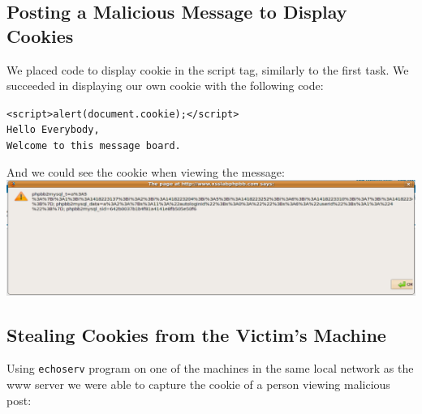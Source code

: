 \documentclass[12pt, a4paper, pdflatex]{article}
\begin{document}
\subsection{Posting a Malicious Message to Display Cookies}
We placed code to display cookie in the script tag, similarly to the first task. We succeeded in displaying our own cookie with the following code:\\
\begin{center}\texttt{<script>alert(document.cookie);</script>\\Hello Everybody,\\Welcome to this message board.}\end{center}

And we could see the cookie when viewing the message:\\
\includegraphics[width=.95\textwidth]{gfx/xss/task2.png}

\subsection{Stealing Cookies from the Victim's Machine}
Using \texttt{echoserv} program on one of the machines in the same local network as the www server we were able to capture the cookie of a person viewing malicious post:\\
\end{document}
